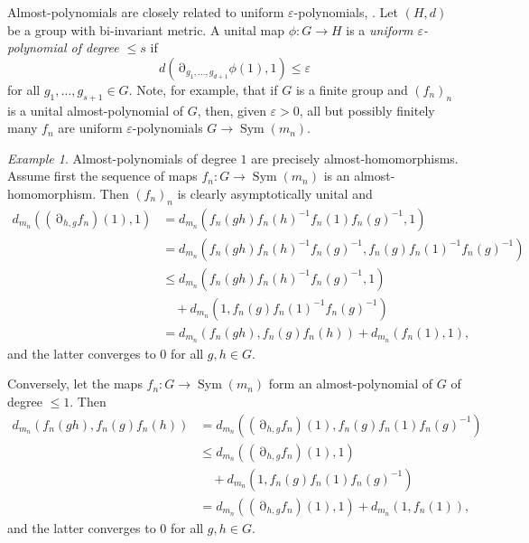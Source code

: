 \documentclass[a4paper,12pt]{amsart}
\theoremstyle{plain}
\theoremstyle{definition}
\theoremstyle{remark}
\newtheorem{example}[subsection]{{\it Example}}
\numberwithin{equation}{subsection}
\DeclareMathOperator{\Sym}{Sym}
\DeclareMathOperator{\mypartial}{\partial}
\begin{document}
Almost-polynomials are closely related to uniform $\varepsilon$-polynomials, \cite{JT24}. Let $(H,d)$ be a group with bi-invariant metric. A unital map $\phi:G\to H$ is a \emph{uniform $\varepsilon$-polynomial of degree $\le s$} if
    $$d(\mypartial_{g_1,...,g_{d+1}}\phi(1),1)\le\varepsilon$$
    for all $g_1,\ldots ,g_{s+1}\in G$.  Note, for example, that if $G$ is a finite group and $(f_n)_n$ is a unital almost-polynomial of $G$, then, given $\varepsilon>0$, all but possibly finitely many $f_n$ are uniform $\varepsilon$-polynomials $G\to\Sym(m_n)$.

\begin{example}
    \label{ex:deg1}
    Almost-polynomials of degree $1$ are precisely almost-homomorphisms. Assume first the sequence of maps $f_n:G\to\Sym(m_n)$ is an almost-homomorphism. Then $(f_n)_n$ is clearly asymptotically unital and
    \begin{align*}
        d_{m_n}((\mypartial_{h,g}f_n)(1),1) &=
        d_{m_n}(f_n(gh)f_n(h)^{-1}f_n(1)f_n(g)^{-1},1)\\
        &= d_{m_n}(f_n(gh)f_n(h)^{-1}f_n(g)^{-1},f_n(g)f_n(1)^{-1}f_n(g)^{-1})\\
        &\le d_{m_n}(f_n(gh)f_n(h)^{-1}f_n(g)^{-1},1)\\
        &\quad +
        d_{m_n}(1, f_n(g)f_n(1)^{-1}f_n(g)^{-1})\\
        &= d_{m_n}(f_n(gh),f_n(g)f_n(h))+d_{m_n}(f_n(1),1),
    \end{align*}
    and the latter converges to $0$ for all $g,h\in G$. 

    Conversely, let the maps $f_n:G\to\Sym(m_n)$ form an almost-polynomial of $G$ of degree $\le 1$. Then
    \begin{align*}
        d_{m_n}(f_n(gh),f_n(g)f_n(h)) 
        &= d_{m_n}((\mypartial_{h,g}f_n)(1),f_n(g)f_n(1)f_n(g)^{-1})\\
        &\le d_{m_n}((\mypartial_{h,g}f_n)(1),1)\\
        &\quad +d_{m_n}(1,f_n(g)f_n(1)f_n(g)^{-1})\\
        &=d_{m_n}((\mypartial_{h,g}f_n)(1),1)+d_{m_n}(1,f_n(1)),
    \end{align*}
    and the latter converges to $0$ for all $g,h\in G$.
\end{example}
\end{document}
